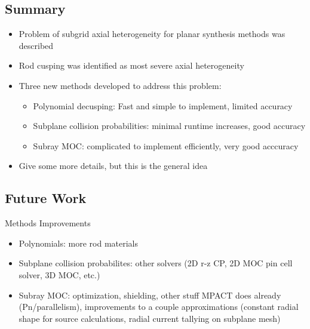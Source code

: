 \subsection{Summary}
\begin{frame}
    
    \begin{itemize}
        \item Problem of subgrid axial heterogeneity for planar synthesis methods was described
        \item Rod cusping was identified as most severe axial heterogeneity
        \item Three new methods developed to address this problem:
        \begin{itemize}
            \item Polynomial decusping: Fast and simple to implement, limited accuracy
            \item Subplane collision probabilities: minimal runtime increases, good accuracy
            \item Subray MOC: complicated to implement efficiently, very good acccuracy
        \end{itemize}
        \item Give some more details, but this is the general idea
    \end{itemize}
    
\end{frame}


\subsection{Future Work}
\begin{frame}[t]{Methods Improvements}
    
    \begin{itemize}
        \item Polynomials: more rod materials
        \item Subplane collision probabilites: other solvers (2D r-z CP, 2D MOC pin cell solver, 3D MOC, etc.)
        \item Subray MOC: optimization, shielding, other stuff MPACT does already (Pn/parallelism), improvements to a couple approximations (constant radial shape for source calculations, radial current tallying on subplane mesh)
    \end{itemize}
    
\end{frame}

